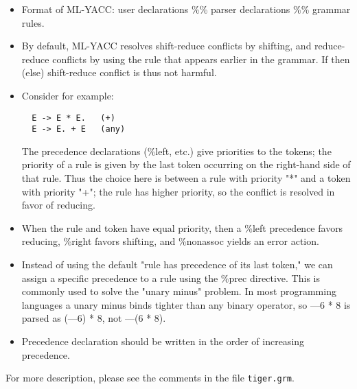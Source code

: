 \begin{itemize}
  \item Format of ML-YACC: user declarations \%\% parser declarations \%\% grammar rules.
  \item By default, ML-YACC resolves shift-reduce conflicts by shifting, and reduce-reduce conflicts by using the rule that appears earlier in the grammar. If then (else) shift-reduce conflict is thus not harmful.
  \item Consider for example: 
  \begin{verbatim}
  E -> E * E.   (+)
  E -> E. + E   (any)
  \end{verbatim}
  The precedence declarations (\%left, etc.) give priorities to the tokens; the priority of a rule is given by the last token occurring on the right-hand side of that rule. Thus the choice here is between a rule with priority "*" and a token with priority "+"; the rule has higher priority, so the conflict is resolved in favor of reducing.
  \item When the rule and token have equal priority, then a \%left precedence favors reducing, \%right favors shifting, and \%nonassoc yields an error action.
  \item Instead of using the default "rule has precedence of its last token," we can assign a specific precedence to a rule using the \%prec directive. This is commonly used to solve the "unary minus" problem. In most programming languages a unary minus binds tighter than any binary operator, so —6 * 8 is parsed as (—6) * 8, not —(6 * 8).
  \item Precedence declaration should be written in the order of increasing precedence. 
\end{itemize}

For more description, please see the comments in the file \texttt{tiger.grm}.